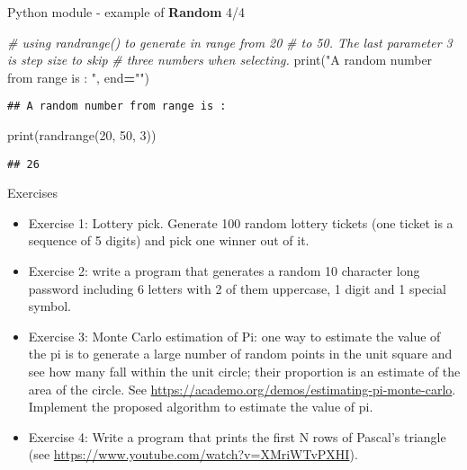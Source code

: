\documentclass[
  8pt,
  ignorenonframetext,
]{beamer}
\newenvironment{Shaded}{\begin{snugshade}}{\end{snugshade}}
\newcommand{\BuiltInTok}[1]{#1}
\newcommand{\CommentTok}[1]{\textcolor[rgb]{0.56,0.35,0.01}{\textit{#1}}}
\newcommand{\DecValTok}[1]{\textcolor[rgb]{0.00,0.00,0.81}{#1}}
\newcommand{\NormalTok}[1]{#1}
\newcommand{\OperatorTok}[1]{\textcolor[rgb]{0.81,0.36,0.00}{\textbf{#1}}}
\newcommand{\StringTok}[1]{\textcolor[rgb]{0.31,0.60,0.02}{#1}}
\begin{document}
\begin{frame}[fragile]{Python module - example of \textbf{Random} 4/4}
\protect\hypertarget{python-module---example-of-random-44}{}
\begin{Shaded}
\begin{Highlighting}[]
\CommentTok{\# using randrange() to generate in range from 20}
\CommentTok{\# to 50. The last parameter 3 is step size to skip}
\CommentTok{\# three numbers when selecting.}
\BuiltInTok{print}\NormalTok{(}\StringTok{"A random number from range is : "}\NormalTok{, end}\OperatorTok{=}\StringTok{""}\NormalTok{)}
\end{Highlighting}
\end{Shaded}

\begin{verbatim}
## A random number from range is :
\end{verbatim}

\begin{Shaded}
\begin{Highlighting}[]
\BuiltInTok{print}\NormalTok{(randrange(}\DecValTok{20}\NormalTok{, }\DecValTok{50}\NormalTok{, }\DecValTok{3}\NormalTok{))}
\end{Highlighting}
\end{Shaded}

\begin{verbatim}
## 26
\end{verbatim}
\end{frame}

\begin{frame}{Exercises}
\protect\hypertarget{exercises}{}
\begin{itemize}
\item
  Exercise 1: Lottery pick. Generate 100 random lottery tickets (one
  ticket is a sequence of 5 digits) and pick one winner out of it.
\item
  Exercise 2: write a program that generates a random 10 character long
  password including 6 letters with 2 of them uppercase, 1 digit and 1
  special symbol.
\item
  Exercise 3: Monte Carlo estimation of Pi: one way to estimate the
  value of the pi is to generate a large number of random points in the
  unit square and see how many fall within the unit circle; their
  proportion is an estimate of the area of the circle. See
  \url{https://academo.org/demos/estimating-pi-monte-carlo}. Implement
  the proposed algorithm to estimate the value of pi.
\item
  Exercise 4: Write a program that prints the first N rows of Pascal's
  triangle (see \url{https://www.youtube.com/watch?v=XMriWTvPXHI}).
\end{itemize}
\end{frame}
\end{document}
